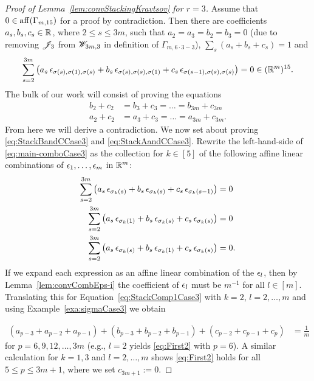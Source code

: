 \begin{proof}[Proof of Lemma~\ref{lem:convStackingKravtsov} for $r=3$]
	 Assume that $0 \in \operatorname{aff}(\Gamma_{m, 15})$ for a proof by contradiction. Then there are coefficients $a_s, b_s, c_s \in \mathbb R$, where $2 \leq s \leq 3 m$, such that $a_2 = a_3 = b_2 = b_3 = 0$ (due to removing $\mathscr{J}_3$ from $\mathscr{W}_{3m,3}$ in definition of $\Gamma_{m, 6\cdot 3 -3}$), $\sum_s (a_s + b_s + c_s) = 1$ and
	\begin{align}
		\sum_{s= 2}^{3 m} \left( a_s \, \epsilon_{\sigma(s),\sigma(1),\sigma(s)}
		+ b_s \, \epsilon_{\sigma(s),\sigma(s),\sigma(1)} + c_s \, \epsilon_{\sigma(s-1),\sigma(s),\sigma(s)}  \right) = 0 \in (\mathbb R^m)^{15}.\label{eq:main-comboCase3}
	\end{align}
	The bulk of our work will consist of proving the equations
	\begin{align}\label{eq:StackBandCCase3}
		b_2 + c_2 &= b_3 + c_3 = \ldots = b_{3 m} + c_{3 m}\\
		\label{eq:StackAandCCase3} a_2 + c_2 &= a_3 + c_3 = \ldots = a_{3 m} + c_{3 m}.
	\end{align}
	From here we will derive a contradiction. We now set about proving \eqref{eq:StackBandCCase3} and \eqref{eq:StackAandCCase3}. Rewrite the left-hand-side of \eqref{eq:main-comboCase3} as the collection for $k \in [5]$ of the following affine linear combinations of $\epsilon_1,\ldots,\epsilon_m$ in $\mathbb R^m$:
	\begin{align}
		\sum_{s= 2}^{3m} \left( a_s \, \epsilon_{\sigma_k(s)} 
		+ b_s \, \epsilon_{\sigma_k(s)} + c_s \, \epsilon_{\sigma_k(s-1)}  \right) &= 0 \label{eq:StackComp1Case3}\\
		\sum_{s= 2}^{3m} \left( a_s \, \epsilon_{\sigma_k(1)}
		+ b_s \, \epsilon_{\sigma_k(s)} + c_s \, \epsilon_{\sigma_k(s)}  \right) &= 0 \label{eq:StackComp2Case3} \\
		\sum_{s= 2}^{3m} \left( a_s \, \epsilon_{\sigma_k(s)}
		+ b_s \, \epsilon_{\sigma_k(1)} + c_s \, \epsilon_{\sigma_k(s)}  \right) &= 0. \label{eq:StackComp3Case3}
	\end{align}
	If we expand each expression as an affine linear combination of the $\epsilon_l$, then by Lemma~\ref{lem:convCombEps-i} the coefficient of $\epsilon_l$ must be $m^{-1}$ for all $l \in [m]$. Translating this for Equation~\eqref{eq:StackComp1Case3} with $k = 2$, $l=2,\ldots,m$ and using Example~\ref{exa:sigmaCase3} we obtain 
	
	\begin{align}
		(a_{p-3} + a_{p-2} + a_{p-1}) + (b_{p-3} + b_{p-2} + b_{p-1})  + (c_{p-2} + c_{p-1} + c_{p}) &= \frac{1}{m} \label{eq:First2}
	\end{align}
	for $p = 6,9,12,\dots, 3m$ (e.g., $l=2$ yields \eqref{eq:First2} with $p = 6$). A similar calculation for $k=1,3$ and $l=2,\ldots,m$ shows \eqref{eq:First2} holds for all $5 \leq p \leq 3m +1$, where we set  $c_{3 m + 1} := 0$.
	

\end{proof}

